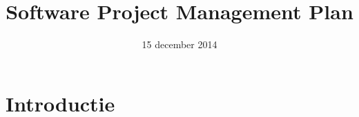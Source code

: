 \documentclass{article}
\title{Software Project Management Plan}
\author{} %
\date{15 december 2014} %
\begin{document}




\tableofcontents
\newpage


\newcommand{\comment}[1]{}



\comment{



sectie 3.1

sectie 3.2

sectie 3.3

sectie 4.1
- Hoe ga je als groep configuration management aanpakken?


Algemeen:
Dit is een vrij uitgebreide eerste versie, met hier en daar nog (vaak zelf aangegeven) punten waar aanvulling noodzakelijk is. Eem werkplan ontbreekt. Probeer zo veel mogelijk aan te vullen voor volgende opleveringen. 
}










\section{Introductie}
\end{document}
